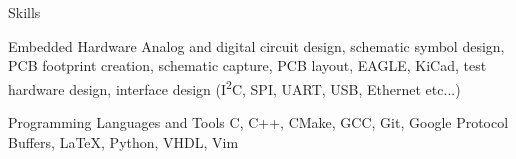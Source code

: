 

\section{\faToolbox}{Skills}

 \resumeEntryStart
  \resumeEntryS
	{Embedded Hardware}
	{
     Analog and digital circuit design, schematic symbol design, PCB footprint
     creation, schematic capture, PCB layout, EAGLE, KiCad, test hardware
     design, interface design (I\textsuperscript{2}C, SPI, UART, USB, Ethernet
     etc...)
	}

  \resumeEntryS
	{Programming Languages and Tools}
	{
     C, C++, CMake, GCC, Git, Google Protocol Buffers, \LaTeX, Python, VHDL, Vim
	}

  \vspace{5pt}
 \resumeEntryEnd
